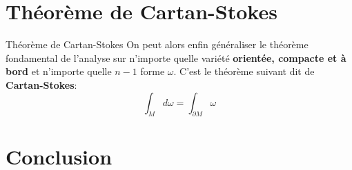\documentclass{beamer}
\begin{document}
    \section{Théorème de Cartan-Stokes}
        \begin{frame}{Théorème de Cartan-Stokes}
            On peut alors enfin généraliser le théorème fondamental de l'analyse sur n'importe quelle variété \textbf{orientée, compacte et à bord} et n'importe quelle $n-1$ forme $\omega$. C'est le théorème suivant dit de \textbf{Cartan-Stokes}:
            \[
                \int_{M} d\omega = \int_{\partial M} \omega
            \]
        \end{frame}
    \section{Conclusion}
\end{document}
